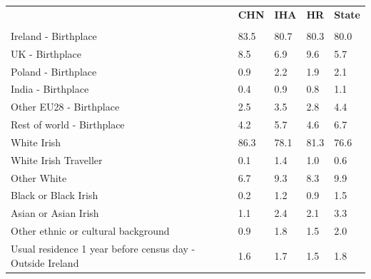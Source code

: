 \documentclass{article}
\begin{document}
\pagebreak
\begin{table}[h]	
\centering
		\begin{tabular}{KTTTT}
  \hline
& \textbf{CHN} & \textbf{IHA} & \textbf{HR}& \textbf{State}\\ 
  \hline
    \\ 
    \hline
Ireland - Birthplace & 83.5& 80.7& 80.3& 80.0\\
UK - Birthplace & 8.5& 6.9& 9.6& 5.7\\
Poland - Birthplace & 0.9& 2.2& 1.9& 2.1\\
India - Birthplace & 0.4& 0.9& 0.8& 1.1\\
Other EU28 - Birthplace & 2.5& 3.5& 2.8& 4.4\\
Rest of world - Birthplace & 4.2& 5.7& 4.6& 6.7\\
    \hline
White Irish & 86.3& 78.1& 81.3& 76.6\\
White Irish Traveller & 0.1& 1.4& 1.0& 0.6\\
Other White & 6.7& 9.3& 8.3& 9.9\\
Black or Black Irish & 0.2& 1.2& 0.9& 1.5\\
Asian or Asian Irish & 1.1& 2.4& 2.1& 3.3\\
Other ethnic or cultural background & 0.9& 1.8& 1.5& 2.0\\
    \hline
Usual residence 1 year before census day - Outside Ireland & 1.6& 1.7& 1.5& 1.8\\


\end{tabular}
\end{table}
\end{document}
